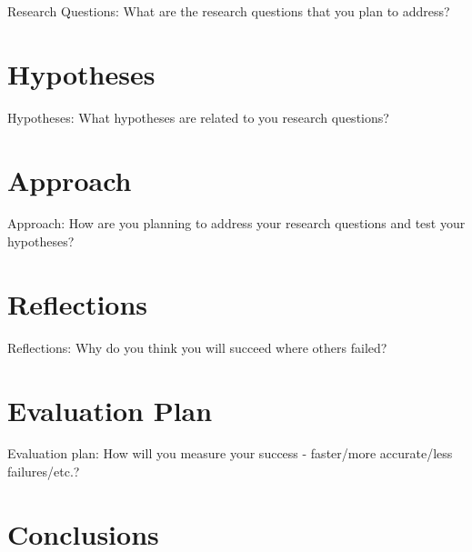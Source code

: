 \documentclass{llncs}
\begin{document}
Research Questions: What are the research questions that you plan to
address?

\section{Hypotheses}
Hypotheses: What hypotheses are related to you research questions?

\section{Approach}
Approach: How are you planning to address your research questions and
test your hypotheses?

\section{Reflections}
Reflections: Why do you think you will succeed where others failed?

\section{Evaluation Plan}
Evaluation plan: How will you measure your success - faster/more
accurate/less failures/etc.?

\section{Conclusions}
\label{sec:conclusions}



%

\end{document}
